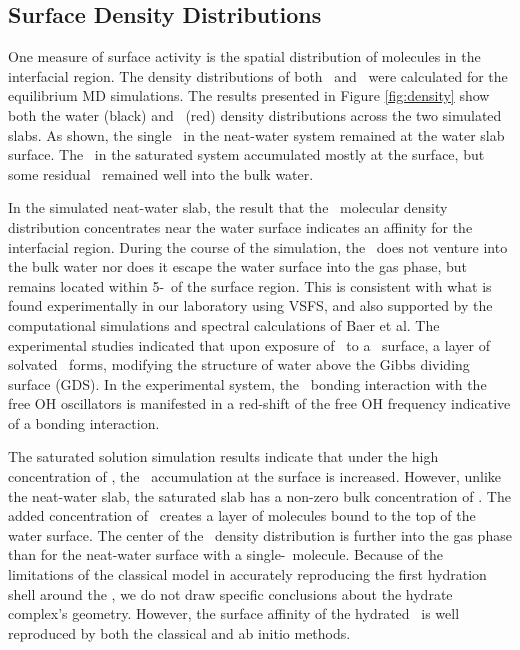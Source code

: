 \subsection{Surface Density Distributions}

One measure of surface activity is the spatial distribution of molecules in the interfacial region. The density distributions of both \wat~and \suldiox~were calculated for the equilibrium MD simulations. The results presented in Figure \ref{fig:density} show both the water (black) and \suldiox~(red) density distributions across the two simulated slabs. As shown, the single \suldiox~in the neat-water system remained at the water slab surface. The \suldiox~in the saturated system accumulated mostly at the surface, but some residual \suldiox~remained well into the bulk water.



In the simulated neat-water slab, the result that the \suldiox~molecular density distribution concentrates near the water surface indicates an affinity for the interfacial region. During the course of the simulation, the \suldiox~does not venture into the bulk water nor does it escape the water surface into the gas phase, but remains located within 5-\angs~of the surface region. This is consistent with what is found experimentally in our laboratory using VSFS,\cite{Tarbuck2005,Tarbuck2006} and also supported by the computational simulations and spectral calculations of Baer et al.\cite{Baer2010} The experimental studies indicated that upon exposure of \suldiox~to a \wat~surface, a layer of solvated \suldiox~forms, modifying the structure of water above the Gibbs dividing surface (GDS). In the experimental system, the \suldiox~bonding interaction with the free OH oscillators is manifested in a red-shift of the free OH frequency indicative of a bonding interaction. 

The saturated solution simulation results indicate that under the high concentration of \suldiox, the \suldiox~accumulation at the surface is increased. However, unlike the neat-water slab, the saturated slab has a non-zero bulk concentration of \suldiox. The added concentration of \suldiox~creates a layer of molecules bound to the top of the water surface. The center of the \suldiox~density distribution is further into the gas phase than for the neat-water surface with a single-\suldiox~molecule. Because of the limitations of the classical model in accurately reproducing the first hydration shell around the \suldiox,\cite{Baer2010} we do not draw specific conclusions about the hydrate complex's geometry. However, the surface affinity of the hydrated \suldiox~is well reproduced by both the classical and ab initio methods.\cite{Baer2010}

